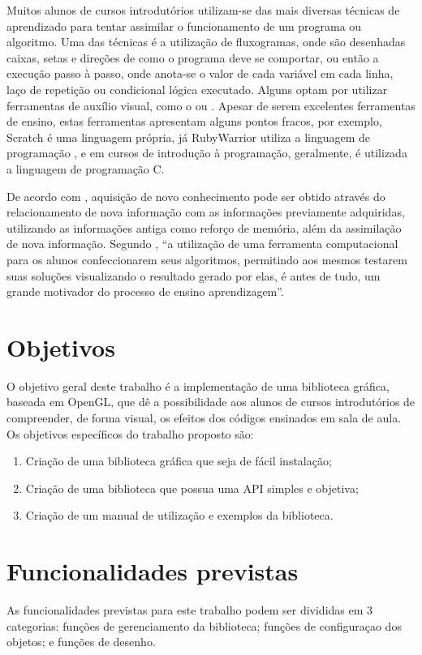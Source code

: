 \documentclass[12pt, %
openright,
oneside, %
a4paper,    %
brazil]{facom-ufu-abntex2}
\begin{document}
Muitos alunos de cursos introdutórios utilizam-se das mais diversas técnicas de aprendizado para tentar assimilar o funcionamento de um programa ou algoritmo. Uma das técnicas é a utilização de fluxogramas, onde são desenhadas caixas, setas e direções de como o programa deve se comportar, ou então a execução passo à passo, onde anota-se o valor de cada variável em cada linha, laço de repetição ou condicional lógica executado. Alguns optam por utilizar ferramentas de auxílio visual, como o  ou . Apesar de serem excelentes ferramentas de ensino, estas ferramentas apresentam alguns pontos fracos, por exemplo, Scratch é uma linguagem própria, já RubyWarrior utiliza a linguagem de programação , e em cursos de introdução à programação, geralmente, é utilizada a linguagem de programação C.

De acordo com , aquisição de novo conhecimento pode ser obtido através do relacionamento de nova informação com as informações previamente adquiridas, utilizando as informações antiga como reforço de memória, além da assimilação de nova informação. Segundo , ``a utilização de uma ferramenta computacional para os alunos confeccionarem seus algoritmos, permitindo aos mesmos testarem suas soluções visualizando o resultado gerado por elas, é antes de tudo, um grande motivador do processo de ensino aprendizagem''.

\section{Objetivos}
O objetivo geral deste trabalho é a implementação de uma biblioteca gráfica, baseada em OpenGL, que dê a possibilidade aos alunos de cursos introdutórios de compreender, de forma visual, os efeitos dos códigos ensinados em sala de aula. Os objetivos específicos do trabalho proposto são:

\begin{enumerate}
\item Criação de uma biblioteca gráfica que seja de fácil instalação;
\item Criação de uma biblioteca que possua uma API simples e objetiva;
\item Criação de um manual de utilização e exemplos da biblioteca.
\end{enumerate}

\section{Funcionalidades previstas}
As funcionalidades previstas para este trabalho podem ser divididas em 3 categorias: funções de gerenciamento da biblioteca; funções de configuraçao dos objetos; e funções de desenho.
\end{document}
